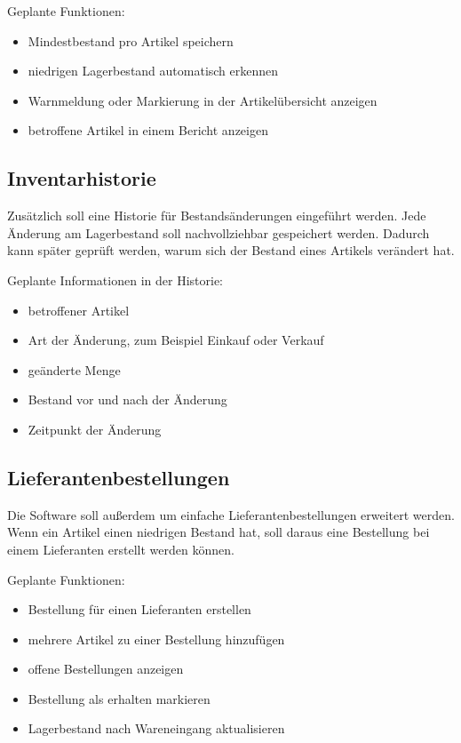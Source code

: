 \documentclass[12pt,a4paper]{article}
\begin{document}
	Geplante Funktionen:
	
	\begin{itemize}
		\item Mindestbestand pro Artikel speichern
		\item niedrigen Lagerbestand automatisch erkennen
		\item Warnmeldung oder Markierung in der Artikelübersicht anzeigen
		\item betroffene Artikel in einem Bericht anzeigen
	\end{itemize}
	
	\subsection{Inventarhistorie}
	
	Zusätzlich soll eine Historie für Bestandsänderungen eingeführt werden. Jede
	Änderung am Lagerbestand soll nachvollziehbar gespeichert werden. Dadurch kann
	später geprüft werden, warum sich der Bestand eines Artikels verändert hat.
	
	Geplante Informationen in der Historie:
	
	\begin{itemize}
		\item betroffener Artikel
		\item Art der Änderung, zum Beispiel Einkauf oder Verkauf
		\item geänderte Menge
		\item Bestand vor und nach der Änderung
		\item Zeitpunkt der Änderung
	\end{itemize}
	
	\subsection{Lieferantenbestellungen}
	
	Die Software soll außerdem um einfache Lieferantenbestellungen erweitert werden.
	Wenn ein Artikel einen niedrigen Bestand hat, soll daraus eine Bestellung bei
	einem Lieferanten erstellt werden können.
	
	Geplante Funktionen:
	
	\begin{itemize}
		\item Bestellung für einen Lieferanten erstellen
		\item mehrere Artikel zu einer Bestellung hinzufügen
		\item offene Bestellungen anzeigen
		\item Bestellung als erhalten markieren
		\item Lagerbestand nach Wareneingang aktualisieren
	\end{itemize}
	
\end{document}

